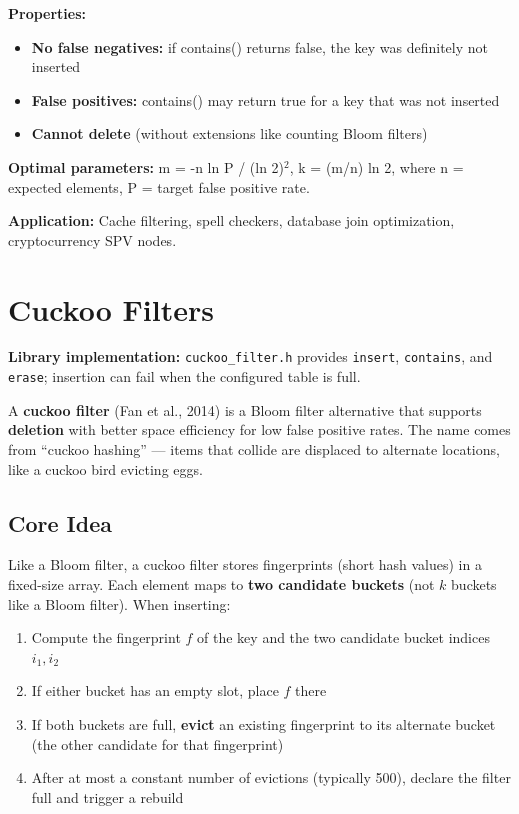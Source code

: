 \textbf{Properties:}
\begin{itemize}
\item \textbf{No false negatives:} if contains() returns false, the key was definitely not inserted
\item \textbf{False positives:} contains() may return true for a key that was not inserted
\item \textbf{Cannot delete} (without extensions like counting Bloom filters)
\end{itemize}

\textbf{Optimal parameters:} m = -n ln P / (ln 2)$^{2}$, k = (m/n) ln 2, where n = expected elements, P = target false positive rate.

\textbf{Application:} Cache filtering, spell checkers, database join optimization, cryptocurrency SPV nodes.

\section{Cuckoo Filters}

\textbf{Library implementation:} \texttt{cuckoo\_filter.h} provides \texttt{insert}, \texttt{contains}, and \texttt{erase}; insertion can fail when the configured table is full.

A \textbf{cuckoo filter} (Fan et al., 2014) is a Bloom filter alternative that supports \textbf{deletion} with better space efficiency for low false positive rates. The name comes from ``cuckoo hashing'' — items that collide are displaced to alternate locations, like a cuckoo bird evicting eggs.

\subsection{Core Idea}

Like a Bloom filter, a cuckoo filter stores fingerprints (short hash values) in a fixed-size array. Each element maps to \textbf{two candidate buckets} (not $k$ buckets like a Bloom filter). When inserting:

\begin{enumerate}
\item Compute the fingerprint $f$ of the key and the two candidate bucket indices $i_1, i_2$
\item If either bucket has an empty slot, place $f$ there
\item If both buckets are full, \textbf{evict} an existing fingerprint to its alternate bucket (the other candidate for that fingerprint)
\item After at most a constant number of evictions (typically 500), declare the filter full and trigger a rebuild
\end{enumerate}

